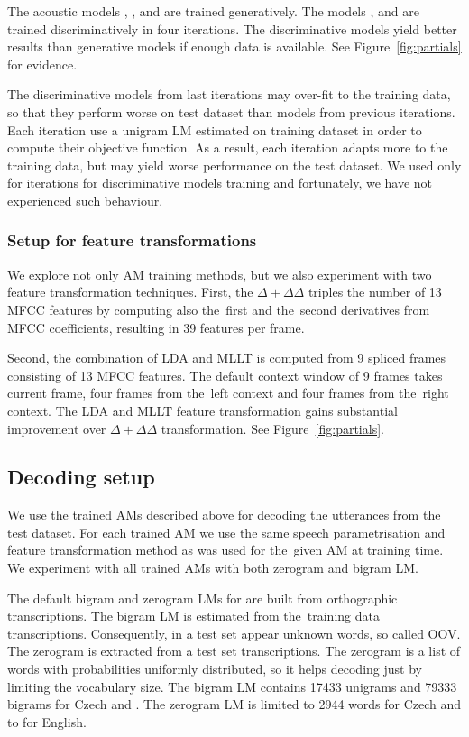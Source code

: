 The acoustic models , ,  and  are trained generatively.
The models ,  and  are trained discriminatively in four iterations.
The discriminative models yield better results than generative models if enough data is available. 
See Figure~\ref{fig:partials} for evidence.

The discriminative models from last iterations may over-fit to the training data, so that they perform worse on test dataset than models from previous iterations. 
Each iteration use a unigram \ac{LM} estimated on training dataset in order to compute their objective function.
As a result, each iteration adapts more to the training data, but may yield worse performance on the test dataset.
We used only for iterations for discriminative models training and fortunately, we have not experienced such behaviour.

\subsubsection*{Setup for feature transformations}
We explore not only \ac{AM} training methods, but we also experiment with two feature transformation techniques.
First, the $\Delta + \Delta\Delta$ triples the number of 13 \ac{MFCC} features by computing also the~first and the~second derivatives from \ac{MFCC} coefficients, resulting in 39 features per frame.

Second, the combination of \ac{LDA} and \ac{MLLT} is computed from 9 spliced frames consisting of 13 \ac{MFCC} features. 
The default context window of 9 frames takes current frame, four frames from the~left context and four frames from the~right context.
The \ac{LDA} and \ac{MLLT} feature transformation gains substantial improvement over $\Delta+\Delta\Delta$ transformation.
See Figure~\ref{fig:partials}.

\subsection*{Decoding setup}
We use the trained \acp{AM} described above for decoding the utterances from the test dataset.
For each trained \ac{AM} we use the same speech parametrisation and feature transformation method as was used for the~given \ac{AM} at training time.
We experiment with all trained \acp{AM} with both zerogram and bigram \ac{LM}.

The default bigram and zerogram \acp{LM} for are built from orthographic transcriptions.
The bigram \ac{LM} is estimated from the~training data transcriptions. 
Consequently, in a test set appear unknown words, so called \acl{OOV}.
The zerogram is extracted from a test set transcriptions.
The zerogram is a list of words with probabilities uniformly distributed, so it helps decoding just by limiting the vocabulary size.
The bigram \ac{LM} contains 17433 unigrams and 79333 bigrams for Czech and . 
The zerogram \ac{LM} is limited to 2944 words for Czech and to  for English.

